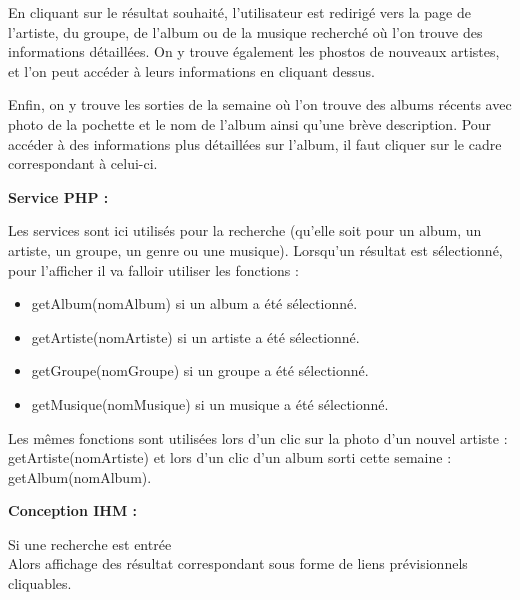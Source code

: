 			\begin{paragraphe}
				En cliquant sur le résultat souhaité, l'utilisateur est redirigé vers la page de l'artiste, du groupe, de l'album ou de la musique recherché où l'on trouve des informations détaillées. On y trouve également les phostos de nouveaux artistes, et l'on peut accéder à leurs informations en cliquant dessus.
			\end{paragraphe}

			\begin{paragraphe}
				Enfin, on y trouve les sorties de la semaine où l'on trouve des albums récents avec photo de la pochette et le nom de l'album ainsi qu'une brève description. Pour accéder à des informations plus détaillées sur l'album, il faut cliquer sur le cadre correspondant à celui-ci.
			\end{paragraphe}

			\begin{paragraphe}
				\textbf{Service PHP :}
			\end{paragraphe}

			\begin{paragraphe}
				Les services sont ici utilisés pour la recherche (qu'elle soit pour un album, un artiste, un groupe, un genre ou une musique). Lorsqu'un résultat est sélectionné, pour l'afficher il va falloir utiliser les fonctions :
				\begin{itemize}
					\item getAlbum(nomAlbum) si un album a été sélectionné.
					\item getArtiste(nomArtiste) si un artiste a été sélectionné.
					\item getGroupe(nomGroupe) si un groupe a été sélectionné.
					\item getMusique(nomMusique) si un musique a été sélectionné.
				\end{itemize}
				Les mêmes fonctions sont utilisées lors d'un clic sur la photo d'un nouvel artiste : getArtiste(nomArtiste) et lors d'un clic d'un album sorti cette semaine : getAlbum(nomAlbum).
			\end{paragraphe}

			\begin{paragraphe}
				\textbf{Conception IHM :}
			\end{paragraphe}


			\begin{paragraphe}
				Si une recherche est entrée \\
				Alors affichage des résultat correspondant sous forme de liens prévisionnels cliquables.
			\end{paragraphe}

